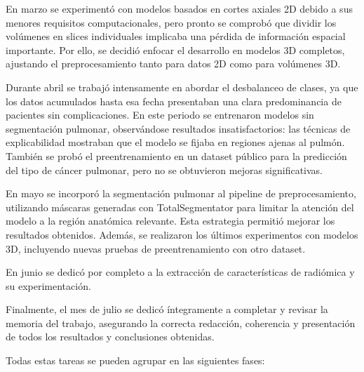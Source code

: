 En marzo se experimentó con modelos basados en cortes axiales 2D debido a sus menores requisitos computacionales, pero pronto se comprobó que dividir los volúmenes en slices individuales implicaba una pérdida de información espacial importante. Por ello, se decidió enfocar el desarrollo en modelos 3D completos, ajustando el preprocesamiento tanto para datos 2D como para volúmenes 3D.

Durante abril se trabajó intensamente en abordar el desbalanceo de clases, ya que los datos acumulados hasta esa fecha presentaban una clara predominancia de pacientes sin complicaciones. En este periodo se entrenaron modelos sin segmentación pulmonar, observándose resultados insatisfactorios: las técnicas de explicabilidad mostraban que el modelo se fijaba en regiones ajenas al pulmón. También se probó el preentrenamiento en un dataset público para la predicción del tipo de cáncer pulmonar, pero no se obtuvieron mejoras significativas.

En mayo se incorporó la segmentación pulmonar al pipeline de preprocesamiento, utilizando máscaras generadas con TotalSegmentator para limitar la atención del modelo a la región anatómica relevante. Esta estrategia permitió mejorar los resultados obtenidos. Además, se realizaron los últimos experimentos con modelos 3D, incluyendo nuevas pruebas de preentrenamiento con otro dataset. 

En junio se dedicó por completo a la extracción de características de radiómica y su experimentación.

Finalmente, el mes de julio se dedicó íntegramente a completar y revisar la memoria del trabajo, asegurando la correcta redacción, coherencia y presentación de todos los resultados y conclusiones obtenidas.

Todas estas tareas se pueden agrupar en las siguientes fases:

